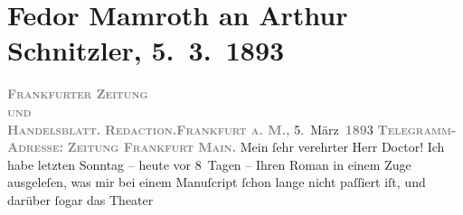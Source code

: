 

         
         \renewcommand{\erwaehntePersonen}{Personen: Fedor Mamroth, Leo N. von Tolstoi}
         \renewcommand{\erwaehnteInstitutionen}{Institutionen: Frankfurter Zeitung}
         \renewcommand{\erwaehnteOrte}{Orte: Deutschland, Frankfurt am Main, Wien, Österreich}
         \renewcommand{\erwaehnteWerke}{Werke: Krieg und Frieden, Sterben. Novelle}
               \section[Fedor Mamroth an Arthur Schnitzler, 5. 3. 1893]{ Fedor Mamroth an Arthur Schnitzler, 5. 3. 1893}\nopagebreak{}\rehead{ }\begin{ledgroupsized}[t]{13cm}\normalsize\beginnumbering{} \toendnotes[C]{\smallbreak\pagebreak[2]} 
\toendnotes[C]{\smallbreak}\pstart
           \noindent{}{\pb}\textcolor{gray}{\textbf{\textsc{Frankfurter Zeitung}}}{\\}\textsc{\textcolor{gray}{\textbf{und}}}{\\}\textcolor{gray}{\textbf{\textsc{Handelsblatt.}}}\pend
           \pstart
           \textcolor{gray}{\textbf{\textsc{Redaction.}}}\hfill \textcolor{gray}{\textbf{\textsc{Frankfurt a. M.,}}}{ }5. März \textsc{\textcolor{gray}{\textbf{189}}}3\pend
           \pstart
           \textcolor{gray}{\textbf{\textsc{Telegramm-Adresse:}}}\pend
           \pstart
           \textcolor{gray}{\textbf{\textsc{Zeitung Frankfurt Main.}}}\pend
           \pstart{}Mein ſehr verehrter Herr Doctor!\pend\pstart
           Ich habe letzten Sonntag – heute vor 8 Tagen – Ihren Roman in einem Zuge ausgeleſen, was mir bei
               einem Manuſcript ſchon lange nicht paſſiert iſt, und darüber ſogar das Theater

\end{ledgroupsized}
